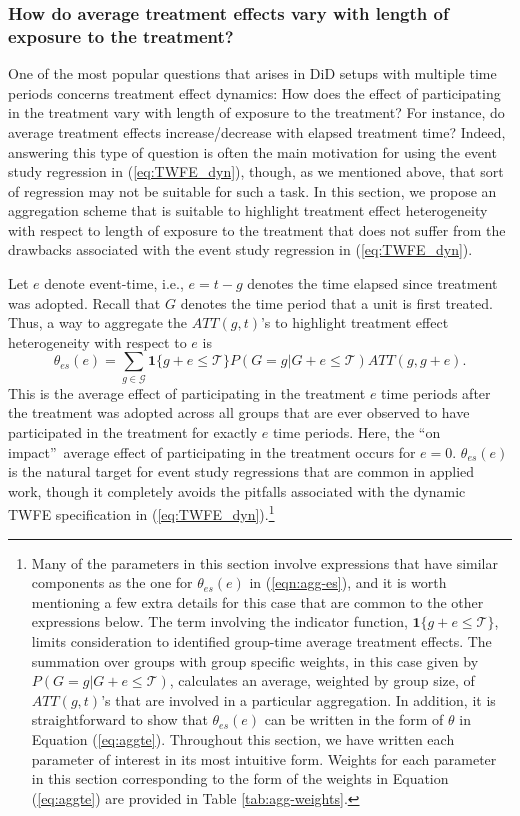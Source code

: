 \documentclass[11pt]{article}%
\theoremstyle{plain}
\numberwithin{sassumption}{section}
\numberwithin{equation}{section}
\begin{document}
\subsubsection{How do average treatment effects vary with length of exposure
to the treatment?}

One of the most popular questions that arises in DiD setups with multiple time
periods concerns treatment effect dynamics: How does the effect of
participating in the treatment vary with length of exposure to the treatment?
For instance, do average treatment effects increase/decrease with elapsed
treatment time? Indeed, answering this type of question is often the main
motivation for using the event study regression in (\ref{eq:TWFE_dyn}),
though, as we mentioned above, that sort of regression may not be suitable for
such a task. In this section, we propose an aggregation scheme that is
suitable to highlight treatment effect heterogeneity with respect to length of
exposure to the treatment that does not suffer from the drawbacks associated
with the event study regression in (\ref{eq:TWFE_dyn}).

Let $e$ denote event-time, i.e., $e=t-g$ denotes the time elapsed since
treatment was adopted. Recall that $G$ denotes the time period that a unit is
first treated. Thus, a way to aggregate the $ATT(g,t)$'s to highlight
treatment effect heterogeneity with respect to $e$ is%
\begin{equation}
\theta_{es}(e)=\sum_{g\in\mathcal{G}}\mathbf{1}\{g+e\leq\mathcal{T}%
\}P(G=g|G+e\leq\mathcal{T})ATT(g,g+e). \label{eqn:agg-es}%
\end{equation}
This is the average effect of participating in the treatment $e$ time periods
after the treatment was adopted across all groups that are ever observed to
have participated in the treatment for exactly $e$ time periods. Here, the
\textquotedblleft on impact\textquotedblright\ average effect of participating
in the treatment occurs for $e=0$. $\theta_{es}(e)$ is the natural target for
event study regressions that are common in applied work, though it completely
avoids the pitfalls associated with the dynamic TWFE specification in
(\ref{eq:TWFE_dyn}).\footnote{Many of the parameters in this section involve
expressions that have similar components as the one for $\theta_{es}(e)$ in (\ref{eqn:agg-es}), and it is worth mentioning a few extra details for this case that are common to the other expressions below. The
term involving the indicator function, $\mathbf{1}\{g+e\leq \mathcal{T}\}$, limits consideration to identified
group-time average treatment effects.  The summation over groups with group specific weights, in this case given by $P(G=g|G+e\leq \mathcal{T})$, calculates an average, weighted by group size, of $ATT(g,t)$'s that are involved in a particular aggregation.  In addition, it is straightforward to
show that $\theta_{es}(e)$ can be written in the form of $\theta$ in Equation
(\ref{eq:aggte}). Throughout this section, we have written each parameter of
interest in its most intuitive form. Weights for each parameter in this section
corresponding to the form of the weights in Equation (\ref{eq:aggte}) are
provided in Table \ref{tab:agg-weights}.}
\end{document}
